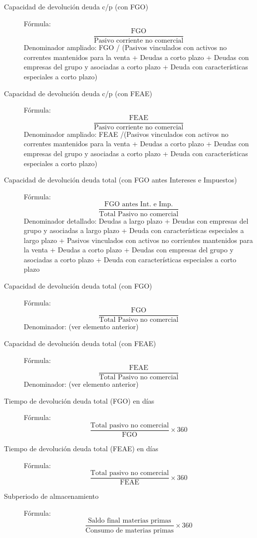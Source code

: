 \documentclass[12pt]{book} %
\begin{document}
\begin{description}
\item[Capacidad de devolución deuda c/p (con FGO)]
Fórmula: $$\displaystyle \frac{\text{FGO}}{\text{Pasivo corriente no comercial}}$$
Denominador ampliado: FGO / (Pasivos vinculados con activos no correntes mantenidos para la venta + Deudas a corto plazo + Deudas con empresas del grupo y asociadas a corto plazo + Deuda con características especiales a corto plazo)

\item[Capacidad de devolución deuda c/p (con FEAE)]
Fórmula: $$\displaystyle \frac{\text{FEAE}}{\text{Pasivo corriente no comercial}}$$
Denominador ampliado: FEAE /(Pasivos vinculados con activos no correntes mantenidos para la venta + Deudas a corto plazo + Deudas con empresas del grupo y asociadas a corto plazo + Deuda con características especiales a corto plazo)

\item[Capacidad de devolución deuda total (con FGO antes Intereses e Impuestos)]
Fórmula: $$\displaystyle \frac{\text{FGO antes Int. e Imp.}}{\text{Total Pasivo no comercial}}$$
Denominador detallado: Deudas a largo plazo + Deudas con empresas del grupo y asociadas a largo plazo + Deuda con características especiales a largo plazo + Pasivos vinculados con activos no corrientes mantenidos para la venta + Deudas a corto plazo + Deudas con empresas del grupo y asociadas a corto plazo + Deuda con características especiales a corto plazo

\item[Capacidad de devolución deuda total (con FGO)]
Fórmula: $$\displaystyle \frac{\text{FGO}}{\text{Total Pasivo no comercial}}$$
Denominador: (ver elemento anterior)

\item[Capacidad de devolución deuda total (con FEAE)]
Fórmula: $$\displaystyle \frac{\text{FEAE}}{\text{Total Pasivo no comercial}}$$
Denominador: (ver elemento anterior)

\item[Tiempo de devolución deuda total (FGO) en días]
Fórmula: $$\displaystyle \frac{\text{Total pasivo no comercial}}{\text{FGO}}\times 360$$

\item[Tiempo de devolución deuda total (FEAE) en días]
Fórmula: $$\displaystyle \frac{\text{Total pasivo no comercial}}{\text{FEAE}}\times 360$$

\item[Subperiodo de almacenamiento]
Fórmula: $$\displaystyle \frac{\text{Saldo final materias primas}}{\text{Consumo de materias primas}}\times 360$$


\end{description}
\end{document}

